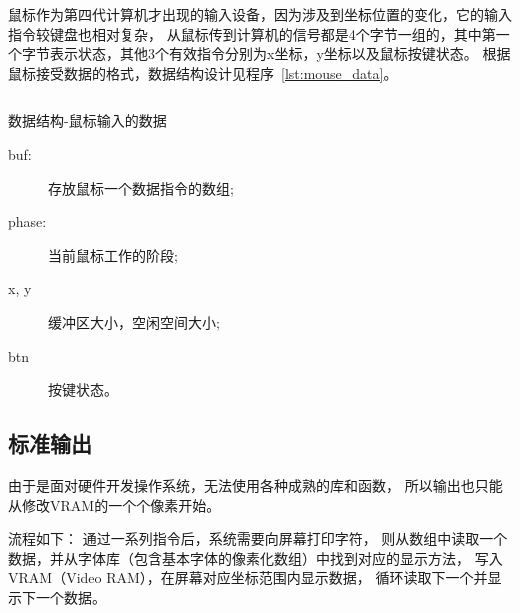 鼠标作为第四代计算机才出现的输入设备，因为涉及到坐标位置的变化，它的输入指令较键盘也相对复杂，
从鼠标传到计算机的信号都是4个字节一组的，其中第一个字节表示状态，其他3个有效指令分别为x坐标，y坐标以及鼠标按键状态。
根据鼠标接受数据的格式，数据结构设计见程序~\ref{lst:mouse_data}。

\begin{listing}[H]
  \inputminted[tabsize=2, firstline=126, lastline=129,
    linenos=true]{c}{../ZOS/src/kernel/bootpack.h}
  \caption{数据结构-鼠标输入的数据}
  \label{lst:mouse_data}
\end{listing}
\begin{description}
\item[buf:]存放鼠标一个数据指令的数组;
\item[phase:]当前鼠标工作的阶段;
\item[x, y]缓冲区大小，空闲空间大小;
\item[btn]按键状态。
\end{description}


\subsection{标准输出}

由于是面对硬件开发操作系统，无法使用各种成熟的库和函数，
所以输出也只能从修改VRAM的一个个像素开始。

流程如下：
通过一系列指令后，系统需要向屏幕打印字符，
则从数组中读取一个数据，并从字体库（包含基本字体的像素化数组）中找到对应的显示方法，
写入VRAM（Video RAM），在屏幕对应坐标范围内显示数据，
循环读取下一个并显示下一个数据。